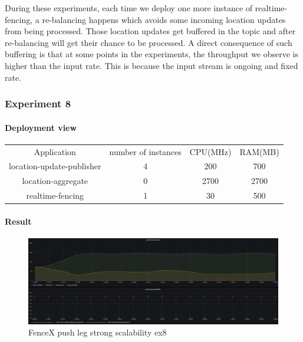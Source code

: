 \documentclass[a4]{report}
\begin{document}
        During these experiments, each time we deploy one more instance of realtime-fencing, a re-balancing happens which
        avoids some incoming location updates from being processed.
        Those location updates get buffered in the topic and after re-balancing will get their chance to be processed.
        A direct consequence of such buffering is that at some points in the experiments, the throughput we observe is
        higher than the input rate.
        This is because the input stream is ongoing and fixed rate.

        \clearpage

        \subsubsection{Experiment 8}

        \paragraph{Deployment view}
        \begin{center}
            \begin{tabular}{ c c c c }
                Application               & number of instances & CPU(MHz) & RAM(MB) \\
                location-update-publisher & 4                   & 200      & 700     \\
                location-aggregate        & 0                   & 2700     & 2700    \\
                realtime-fencing          & 1                   & 30       & 500     \\
            \end{tabular}
        \end{center}

        \paragraph{Result}
        \begin{figure}[ht]
            \caption{FenceX push leg strong scalability ex8}
            \label{fig:ex8}
            \includegraphics[scale=0.4]{images/evaluation/ex8-benchmarking-ongoing-2per4sec.png}
        \end{figure}
\end{document}
